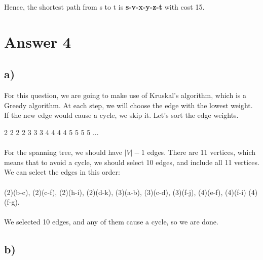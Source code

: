 \documentclass[12pt]{article}
\begin{document}
Hence, the shortest path from s to t is \textbf{s-v-x-y-z-t} with cost 15.
\section*{Answer 4}
\subsection*{a) }

For this question, we are going to make use of Kruskal's algorithm, which is a Greedy algorithm. At each step, we will choose the edge with the lowest weight. If the new edge would cause a cycle, we skip it. Let's sort the edge weights.

2 2 2 2 3 3 3 4 4 4 4 5 5 5 5 ... \\\\

For the spanning tree, we should have $|V|-1$ edges. There are 11 vertices, which means that to avoid a cycle, we should select 10 edges, and include all 11 vertices.\\

We can select the edges in this order:\\\\

(2)(b-c), (2)(c-f), (2)(h-i), (2)(d-k), (3)(a-b), (3)(c-d), (3)(f-j), (4)(e-f), (4)(f-i) (4)(f-g).\\\\

We selected 10 edges, and any of them cause a cycle, so we are done.

\subsection*{b) }
\end{document}
